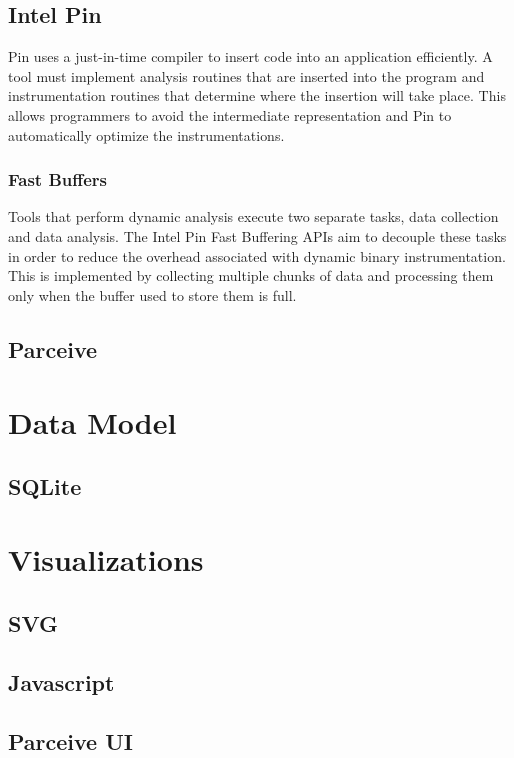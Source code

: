 \subsection{Intel Pin}

Pin uses a just-in-time compiler to insert code into an application efficiently. A tool must implement analysis routines that are inserted into the program and instrumentation routines that determine where the insertion will take place. This allows programmers to avoid the intermediate representation and Pin to automatically optimize the instrumentations.

\subsubsection{Fast Buffers}

Tools that perform dynamic analysis execute two separate tasks, data collection and data analysis. The Intel Pin Fast Buffering APIs \cite{pinbuffer} aim to decouple these tasks in order to reduce the overhead associated with dynamic binary instrumentation. This is implemented by collecting multiple chunks of data and processing them only when the buffer used to store them is full.



\subsection{Parceive}
\section {Data Model}
\subsection{SQLite}
\section {Visualizations}
\subsection {SVG}
\subsection {Javascript}
\subsection {Parceive UI}